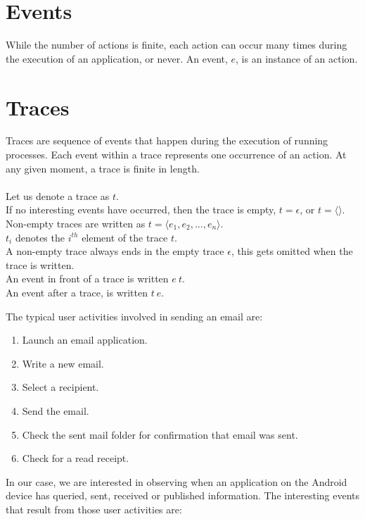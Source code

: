 \section{Events}
\label{sec: LTL Events}

\begin{definition}
\label{def: LTLEvents}
While the number of actions is finite, each action can occur many times during the execution of an application, or never.  An event, $e$, is an instance of an action.
\end{definition}

\section{Traces}
\label{sec:Traces}

\begin{definition}
\label{def: LTLTraces}
Traces are sequence of events that happen during the execution of running processes.  Each event within a trace represents one occurrence of an action.  At any given moment, a trace is finite in length.\\
\\ \noindent
Let us denote a trace as $t$.\\
If no interesting events have occurred, then the trace is empty, $t = \epsilon$, or $t = \langle \rangle$.\\
Non-empty traces are written as $t = \langle e_1,e_2,...,e_n \rangle$.\\
$t_i$ denotes the $i^{th}$ element of the trace $t$.\\
A non-empty trace always ends in the empty trace $\epsilon$, this gets omitted when the trace is written.\\
An event in front of a trace is written $e\ t$.\\
An event after a trace, is written $t\ e$.

\begin{myEx}
The typical user activities involved in sending an email are:\\

\begin{enumerate}
\item  Launch an email application.
\item  Write a new email.
\item  Select a recipient.
\item  Send the email.
\item  Check the sent mail folder for confirmation that email was sent.
\item  Check for a read receipt.
\end{enumerate}
\newpage
In our case, we are interested in observing when an application on the Android device has queried, sent, received or published information.  The interesting events that result from those user activities are:


\end{myEx}
\end{definition}

